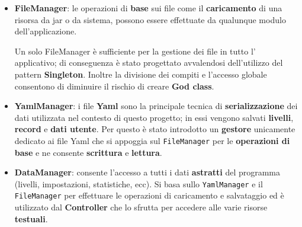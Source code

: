 \begin{itemize}
    \item \textbf{FileManager}: le operazioni di \textbf{base} sui file come il \textbf{caricamento} di una risorsa da jar o da sistema, possono essere effettuate da qualunque modulo dell'applicazione.
    
    Un solo FileManager è sufficiente per la gestione dei file in tutto l' applicativo; di conseguenza è stato progettato avvalendosi dell'utilizzo del pattern \textbf{Singleton}.
    Inoltre la divisione dei compiti e l'accesso globale consentono di diminuire il rischio di creare \textbf{God class}.
    \item \textbf{YamlManager}: i file \textbf{Yaml} sono la principale tecnica di \textbf{serializzazione} dei dati utilizzata nel contesto di questo progetto; in essi vengono salvati \textbf{livelli}, \textbf{record} e \textbf{dati utente}.
    Per questo è stato introdotto un \textbf{gestore} unicamente dedicato ai file Yaml che si appoggia sul \texttt{FileManager} per le \textbf{operazioni di base} e ne consente \textbf{scrittura} e \textbf{lettura}.
    \item \textbf{DataManager}: consente l'accesso a tutti i dati \textbf{astratti} del programma (livelli, impostazioni, statistiche, ecc).
    Si basa sullo \texttt{YamlManager} e il \texttt{FileManager} per effettuare le operazioni di caricamento e salvataggio ed è utilizzato dal \textbf{Controller} che lo sfrutta per accedere alle varie risorse \textbf{testuali}.
\end{itemize}
